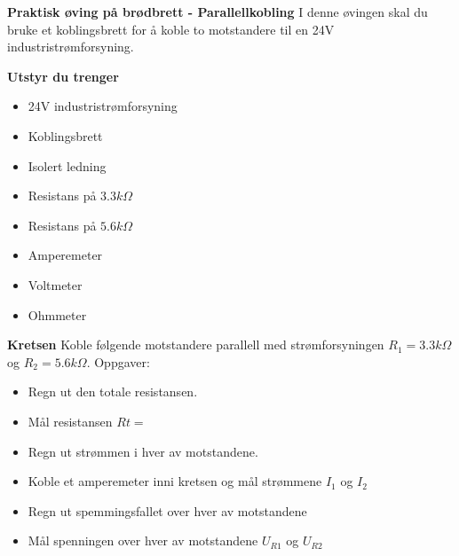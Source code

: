 

\large \textbf{Praktisk øving på brødbrett - Parallellkobling }
\normalsize 
\vskip 10pt 
I denne øvingen skal du bruke et koblingsbrett for å koble to motstandere til en 24V industristrømforsyning.

\vskip 10pt 
\large \textbf{Utstyr du trenger}

\vskip 10pt 
\begin{itemize}[noitemsep]

\item 24V industristrømforsyning
\item Koblingsbrett
\item Isolert ledning
\item Resistans på $3.3k\Omega$
\item Resistans på $5.6k\Omega$
\item Amperemeter
\item Voltmeter
\item Ohmmeter
\end{itemize}


\large \textbf{Kretsen}
\normalsize
\vskip 10pt 
Koble følgende motstandere parallell med strømforsyningen $R_{1}=3.3k\Omega$ og $R_{2}=5.6k\Omega$.
Oppgaver:
\begin{itemize}[noitemsep]
	\item Regn ut den totale resistansen.
	\item Mål resistansen $R{t}=$
	\item Regn ut strømmen i hver av motstandene.
	\item Koble et amperemeter inni kretsen og mål strømmene $I_1$ og $I_2$
	\item Regn ut spemmingsfallet over hver av motstandene
	\item Mål spenningen over hver av motstandene $U_{R1}$ og $U_{R2}$
\end{itemize}




















